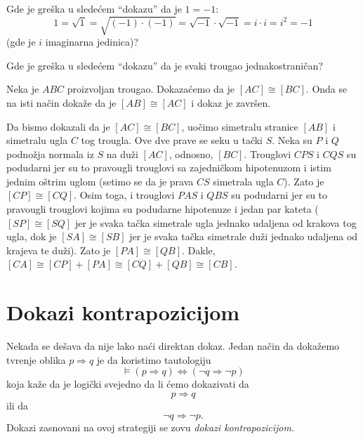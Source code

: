\begin{EX}
  Gde je gre\v ska u slede\'cem ``dokazu'' da je $1 = -1$:
  $$
    1 = \sqrt{1} = \sqrt{(-1) \cdot (-1)} = \sqrt{-1} \cdot \sqrt{-1} = i \cdot i = i^2 = -1
  $$
  (gde je $i$ imaginarna jedinica)?
\end{EX}

\begin{EX}
  Gde je gre\v ska u slede\'cem ``dokazu'' da je svaki trougao jednakostrani\v can?

  Neka je $ABC$ proizvoljan trougao. Dokaza\'cemo da je $[AC] \cong [BC]$. Onda se na isti
  na\v cin doka\v ze da je $[AB] \cong [AC]$ i dokaz je zavr\v sen.
  
  \smallskip
  
  \noindent
  \begin{minipage}{3in}
  \hspace*{1.5em}Da bismo dokazali da je $[AC] \cong [BC]$, uo\v cimo simetralu stranice $[AB]$ i simetralu
  ugla $C$ tog trougla. Ove dve prave se seku u ta\v cki $S$. Neka su $P$ i $Q$ podno\v zja
  normala iz $S$ na du\v zi $[AC]$, odnosno, $[BC]$. Trouglovi $CPS$ i $CQS$ su podudarni jer su to
  pravougli trouglovi sa zajedni\v ckom hipotenuzom i istim jednim o\v strim uglom (setimo se da je prava
  $CS$ simetrala ugla $C$). Zato je $[CP] \cong [CQ]$. Osim toga, i trouglovi $PAS$ i $QBS$ su podudarni jer su to
  pravougli trouglovi kojima su podudarne hipotenuze i jedan par kateta ($[SP] \cong [SQ]$ jer je svaka ta\v cka simetrale
  ugla jednako udaljena od krakova tog ugla, dok je $[SA] \cong [SB]$ jer je svaka ta\v cka simetrale
  du\v zi jednako udaljena od krajeva te du\v zi). Zato je $[PA] \cong [QB]$. Dakle,
  $[CA] \cong [CP] + [PA] \cong [CQ] + [QB] \cong [CB]$.
  \end{minipage}\hfill
  \begin{minipage}{2in}
    \begin{center}
      
    \end{center}
  \end{minipage}
\end{EX}

\section{Dokazi kontrapozicijom}

Nekada se de\v sava da nije lako na\'ci direktan dokaz. Jedan na\v cin da doka\v zemo
tvr\dj enje oblika $p \Rightarrow q$ je da koristimo tautologiju
$$
  \vDash (p \Rightarrow q) \Leftrightarrow (\lnot q \Rightarrow \lnot p)
$$
koja ka\v ze da je logi\v cki svejedno da li \'cemo dokazivati da
$$
  p \Rightarrow q
$$
ili da
$$
  \lnot q \Rightarrow \lnot p.
$$
Dokazi zasnovani na ovoj strategiji se zovu \emph{dokazi kontrapozicijom}.

